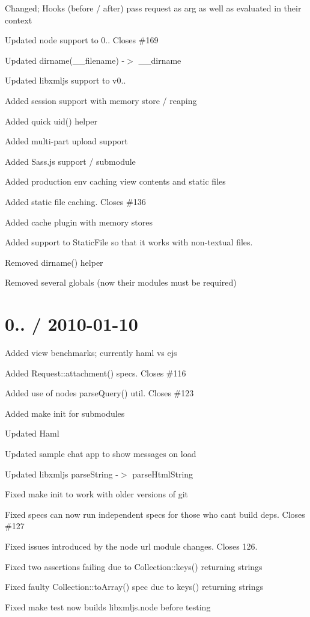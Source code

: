 {\ttfamily }

{\ttfamily 
\begin{DoxyItemize}
\item Changed; Hooks (before / after) pass request as arg as well as evaluated in their context
\item Updated node support to 0.. Closes \#169
\item Updated dirname(\+\_\+\+\_\+filename) -\/$>$ \+\_\+\+\_\+dirname
\item Updated libxmljs support to v0..
\item Added session support with memory store / reaping
\item Added quick uid() helper
\item Added multi-\/part upload support
\item Added Sass.\+js support / submodule
\item Added production env caching view contents and static files
\item Added static file caching. Closes \#136
\item Added cache plugin with memory stores
\item Added support to Static\+File so that it works with non-\/textual files.
\item Removed dirname() helper
\item Removed several globals (now their modules must be required)
\end{DoxyItemize}}

{\ttfamily \section*{0.. / 2010-\/01-\/10 }}

{\ttfamily }

{\ttfamily 
\begin{DoxyItemize}
\item Added view benchmarks; currently haml vs ejs
\item Added Request\+::attachment() specs. Closes \#116
\item Added use of node\textquotesingle{}s parse\+Query() util. Closes \#123
\item Added {\ttfamily make init} for submodules
\item Updated Haml
\item Updated sample chat app to show messages on load
\item Updated libxmljs parse\+String -\/$>$ parse\+Html\+String
\item Fixed {\ttfamily make init} to work with older versions of git
\item Fixed specs can now run independent specs for those who cant build deps. Closes \#127
\item Fixed issues introduced by the node url module changes. Closes 126.
\item Fixed two assertions failing due to Collection\+::keys() returning strings
\item Fixed faulty Collection\+::to\+Array() spec due to keys() returning strings
\item Fixed {\ttfamily make test} now builds libxmljs.\+node before testing
\end{DoxyItemize}}

